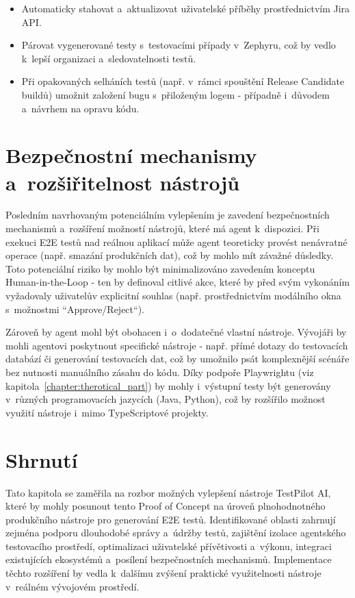 \documentclass[czech, ing, kiv, he, iso690numb, viewonly]{fasthesis}
\begin{document}
\begin{itemize}
    \item Automaticky stahovat a~aktualizovat uživatelské příběhy prostřednictvím Jira API.
    \item Párovat vygenerované testy s~testovacími případy v~Zephyru, což by vedlo k~lepší organizaci a~sledovatelnosti testů.
    \item Při opakovaných selháních testů (např. v~rámci spouštění Release Candidate buildů) 
    umožnit založení bugu s~přiloženým logem - případně i~důvodem a~návrhem na opravu kódu.
\end{itemize}


\section{Bezpečnostní mechanismy a~rozšiřitelnost nástrojů}
Posledním navrhovaným potenciálním vylepšením je zavedení 
bezpečnostních mechanismů a~rozšíření možností nástrojů, které má agent k~dispozici.
Při exekuci E2E testů nad reálnou aplikací může agent teoreticky provést nenávratné operace 
(např. smazání produkčních dat), což by mohlo mít závažné důsledky.
Toto potenciální riziko by mohlo být minimalizováno zavedením konceptu Human-in-the-Loop 
- ten by definoval citlivé akce, které by před svým vykonáním vyžadovaly uživatelův 
explicitní souhlas (např. prostřednictvím modálního okna s~možnostmi ``Approve/Reject``).

Zároveň by agent mohl být obohacen i~o~dodatečné vlastní nástroje. Vývojáři by mohli 
agentovi poskytnout specifické nástroje - např. přímé dotazy do testovacích databází 
či generování testovacích dat, což by umožnilo psát komplexnější scénáře bez nutnosti 
manuálního zásahu do kódu. Díky podpoře Playwrightu (viz kapitola~\ref{chapter:therotical_part})
by mohly i~výstupní testy být generovány v~různých programovacích jazycích (Java, Python), což by 
rozšířilo možnost využití nástroje i~mimo TypeScriptové projekty.

\section{Shrnutí}
Tato kapitola se zaměřila na rozbor možných vylepšení nástroje TestPilot AI, 
které by mohly posunout tento Proof of Concept na úroveň plnohodnotného produkčního nástroje pro generování E2E testů.
Identifikované oblasti zahrnují zejména podporu dlouhodobé správy a~údržby testů, 
zajištění izolace agentského testovacího prostředí, 
optimalizaci uživatelské přívětivosti a~výkonu, integraci existujících ekosystémů a~posílení
bezpečnostních mechanismů. Implementace těchto rozšíření by vedla k~dalšímu zvýšení 
praktické využitelnosti nástroje v~reálném vývojovém prostředí.
\end{document}
